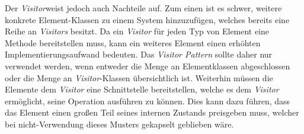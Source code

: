 Der \emph{Visitor}weist jedoch auch Nachteile auf. Zum einen ist es schwer, weitere konkrete Element-Klassen zu einem System hinzuzufügen, welches bereits eine Reihe an \emph{Visitors} besitzt. Da ein \emph{Visitor} für jeden Typ von Element eine Methode bereitstellen muss, kann ein weiteres Element einen erhöhten Implementierungsaufwand bedeuten. Das \emph{Visitor Pattern} sollte daher nur verwendet werden, wenn entweder die Menge an Elementklassen abgeschlossen oder die Menge an \emph{Visitor}-Klassen übersichtlich ist. Weiterhin müssen die Elemente dem \emph{Visitor} eine Schnittstelle bereitstellen, welche es dem \emph{Visitor} ermöglicht, seine Operation ausführen zu können. Dies kann dazu führen, dass das Element einen großen Teil seines internen Zustands preisgeben muss, welcher bei nicht-Verwendung dieses Musters gekapselt geblieben wäre. \cite{gamma_design_1995}